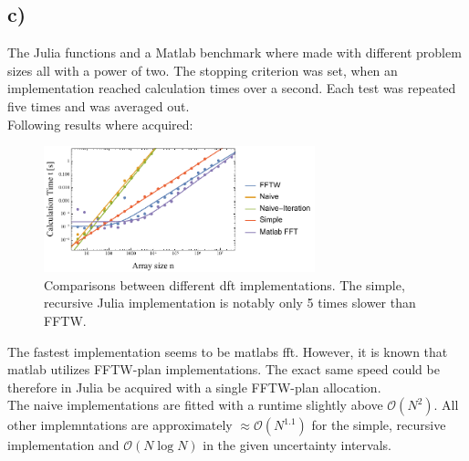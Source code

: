\documentclass[12pt,a4paper]{article}
\begin{document}
	\subsection*{c)}
		The Julia functions and a Matlab benchmark where made with different problem sizes
		all with a power of two. The stopping criterion was set, when an implementation
		reached calculation times over a second. Each test was repeated five times and
		was averaged out.\\
		Following results where acquired:
		\begin{figure}[H]
			\centering
			\includegraphics[width=0.7\textwidth]{A2/data/Comparison.pdf}
			\caption[]{Comparisons between different dft implementations. The simple, recursive
			Julia implementation is notably only 5 times slower than FFTW.}
		\end{figure}
		The fastest implementation seems to be matlabs fft. However, it is known
		that matlab utilizes FFTW-plan implementations. The exact same speed could
		be therefore in Julia be acquired with a single FFTW-plan allocation.\\
		The naive implementations are fitted with a runtime slightly above
		\(\mathcal{O}\left(N^2\right)\). All other implemntations are approximately
		\(\approx\mathcal{O}\left(N^{1.1}\right)\) for the simple, recursive implementation
		and \(\mathcal{O}\left(N\log N\right)\) in the given uncertainty intervals.
\end{document}

